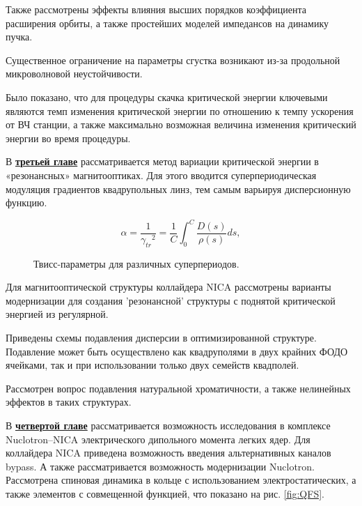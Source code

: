 \par Также рассмотрены эффекты влияния высших порядков коэффициента расширения орбиты, а также простейших моделей импедансов на динамику пучка.

\par Существенное ограничение на параметры сгустка возникают из-за продольной микроволновой неустойчивости. 

\par Было показано, что для процедуры скачка критической энергии ключевыми являются темп изменения критической энергии по отношению к темпу ускорения от ВЧ станции, а также максимально возможная величина изменения критический энергии во время процедуры.

В \underline{\textbf{третьей главе}} рассматривается метод вариации критической энергии в «резонансных» магнитооптиках. Для этого вводится суперпериодическая модуляция градиентов квадрупольных линз, тем самым варьируя дисперсионную функцию. 

\begin{equation}
\alpha=\frac{1}{{\gamma_{tr}}^2}=\frac{1}{C}\int_{0}^{C}\frac{D\left(s\right)}{\rho\left(s\right)}ds,
\label{eq:alpha}
\end{equation}

\begin{figure}[ht]
    \caption{Твисс-параметры для различных суперпериодов.}\label{fig:latex}
\end{figure}

\par Для магнитооптической структуры коллайдера NICA рассмотрены варианты модернизации для создания 'резонансной' структуры с поднятой критической энергией из регулярной. 

\par Приведены схемы подавления дисперсии в оптимизированной структуре. Подавление может быть осуществлено как квадруполями в двух крайних ФОДО ячейками, так и при использовании только двух семейств квадполей.

\par Рассмотрен вопрос подавления натуральной хроматичности, а также нелинейных эффектов в таких структурах.

В \underline{\textbf{четвертой главе}} рассматривается возможность исследования в комплексе Nuclotron–NICA электрического дипольного момента легких ядер. Для коллайдера NICA приведена возможность введения альтернативных каналов bypass. А также рассматривается возможность модернизации Nuclotron. Рассмотрена спиновая динамика в кольце с использованием электростатических, а также элементов с совмещенной функцией, что показано на рис. \ref{fig:QFS}.

